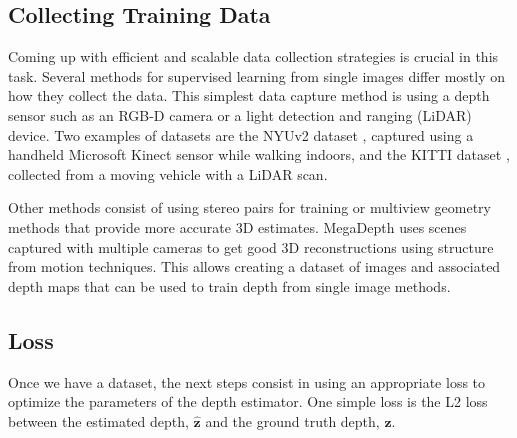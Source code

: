 \subsection{Collecting Training Data}

Coming up with efficient and scalable data collection strategies is crucial in this task. Several methods for supervised learning from single images differ mostly on how they collect the data. This simplest data capture method is using a depth sensor such as an RGB-D camera or a light detection and ranging (LiDAR) device.
Two examples of datasets are the NYUv2 dataset \cite{SilbermanECCV12}, captured using a handheld Microsoft Kinect sensor while walking indoors, and the KITTI dataset \cite{Geiger2013}, collected from a moving vehicle with a LiDAR scan.

Other methods consist of using stereo pairs for training \cite{Xian2018} or multiview geometry methods that provide more accurate 3D estimates. MegaDepth \cite{MegaDepthLi18} uses scenes captured with multiple cameras to get good 3D reconstructions using structure from motion techniques. This allows creating a dataset of images and associated depth maps that can be used to train depth from single image methods.


\subsection{Loss}

Once we have a dataset, the next steps consist in using an appropriate loss to optimize the parameters of the depth estimator. One simple loss is the L2 loss between the estimated depth, $\hat{\mathbf{z}}$ and the ground truth depth, $\mathbf{z}$. 

